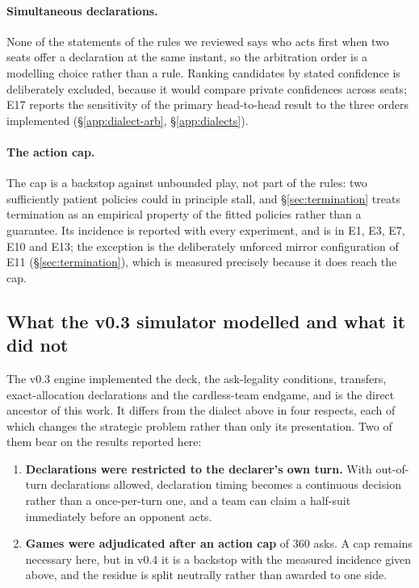 \paragraph{Simultaneous declarations.} None of the statements of the rules we
reviewed says who acts first when two seats offer a declaration at the same
instant, so the arbitration order is a modelling choice rather than a rule.
Ranking candidates by stated confidence is deliberately excluded, because it
would compare private confidences across seats; E17 reports the sensitivity of
the primary head-to-head result to the three orders implemented
(\S\ref{app:dialect-arb}, \S\ref{app:dialects}).

\paragraph{The action cap.} The cap is a backstop against unbounded play, not
part of the rules: two sufficiently patient policies could in principle stall,
and \S\ref{sec:termination} treats
termination as an empirical property of the fitted policies rather than a
guarantee. Its incidence is reported with every experiment, and is
\numLimitRate{} in E1, E3, E7, E10 and E13; the exception is the deliberately
unforced mirror configuration of E11 (\S\ref{sec:termination}), which is
measured precisely because it does reach the cap.

\subsection{What the v0.3 simulator modelled and what it did not}
\label{sec:rules-v03}

The v0.3 engine \cite{fishbot03} implemented the deck, the ask-legality
conditions, transfers, exact-allocation declarations and the cardless-team
endgame, and is the direct ancestor of this work. It differs from the dialect
above in four respects, each of which changes the strategic problem rather than
only its presentation. Two of them bear on the results reported here:

\begin{enumerate}
  \item \textbf{Declarations were restricted to the declarer's own turn.} With
        out-of-turn declarations allowed, declaration timing becomes a
        continuous decision rather than a once-per-turn one, and a team can
        claim a half-suit immediately before an opponent acts.
  \item \textbf{Games were adjudicated after an action cap} of 360 asks. A cap
        remains necessary here, but in v0.4 it is a backstop with the measured
        incidence given above, and the residue is split neutrally rather than
        awarded to one side.
\end{enumerate}

